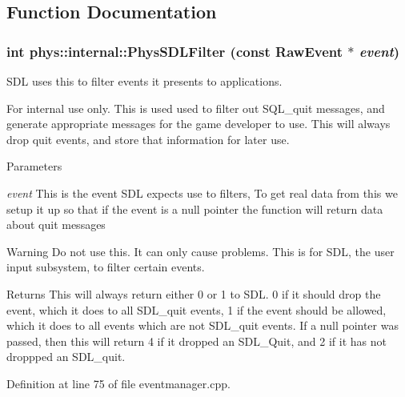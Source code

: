 \subsection{Function Documentation}
\hypertarget{namespacephys_1_1internal_aae2a1133a05c67ac3062038c0c5dad4a}{
\subsubsection[{PhysSDLFilter}]{\setlength{\rightskip}{0pt plus 5cm}int phys::internal::PhysSDLFilter (const RawEvent $\ast$ {\em event})}}
\label{d0/d26/namespacephys_1_1internal_aae2a1133a05c67ac3062038c0c5dad4a}


SDL uses this to filter events it presents to applications. 

\begin{DoxyInternal}{For internal use only.}
This is used used to filter out SQL\_\-quit messages, and generate appropriate messages for the game developer to use. This will always drop quit events, and store that information for later use. 
\begin{DoxyParams}{Parameters}
\item[{\em event}]This is the event SDL expects use to filters, To get real data from this we setup it up so that if the event is a null pointer the function will return data about quit messages \end{DoxyParams}
\begin{DoxyWarning}{Warning}
Do not use this. It can only cause problems. This is for SDL, the user input subsystem, to filter certain events. 
\end{DoxyWarning}
\begin{DoxyReturn}{Returns}
This will always return either 0 or 1 to SDL. 0 if it should drop the event, which it does to all SDL\_\-quit events, 1 if the event should be allowed, which it does to all events which are not SDL\_\-quit events. If a null pointer was passed, then this will return 4 if it dropped an SDL\_\-Quit, and 2 if it has not droppped an SDL\_\-quit. 
\end{DoxyReturn}
\end{DoxyInternal}


Definition at line 75 of file eventmanager.cpp.


